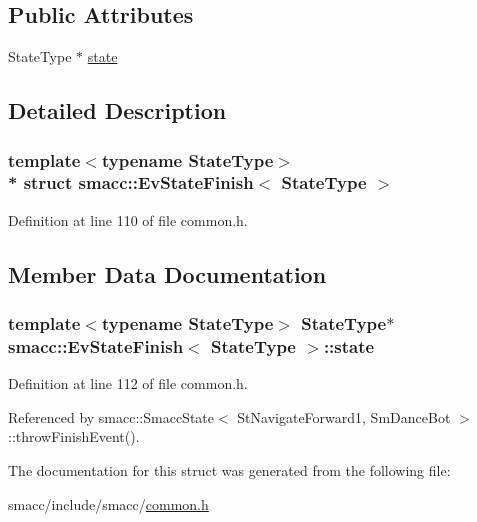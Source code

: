 \subsection*{Public Attributes}
\begin{DoxyCompactItemize}
\item 
State\+Type $\ast$ \hyperlink{structsmacc_1_1EvStateFinish_aa3a3ee44e35e32c7b803926331cb164d}{state}
\end{DoxyCompactItemize}


\subsection{Detailed Description}
\subsubsection*{template$<$typename State\+Type$>$\\*
struct smacc\+::\+Ev\+State\+Finish$<$ State\+Type $>$}



Definition at line 110 of file common.\+h.



\subsection{Member Data Documentation}
\subsubsection[{\texorpdfstring{state}{state}}]{\setlength{\rightskip}{0pt plus 5cm}template$<$typename State\+Type$>$ State\+Type$\ast$ {\bf smacc\+::\+Ev\+State\+Finish}$<$ State\+Type $>$\+::state}\hypertarget{structsmacc_1_1EvStateFinish_aa3a3ee44e35e32c7b803926331cb164d}{}\label{structsmacc_1_1EvStateFinish_aa3a3ee44e35e32c7b803926331cb164d}


Definition at line 112 of file common.\+h.



Referenced by smacc\+::\+Smacc\+State$<$ St\+Navigate\+Forward1, Sm\+Dance\+Bot $>$\+::throw\+Finish\+Event().



The documentation for this struct was generated from the following file\+:\begin{DoxyCompactItemize}
\item 
smacc/include/smacc/\hyperlink{common_8h}{common.\+h}\end{DoxyCompactItemize}
